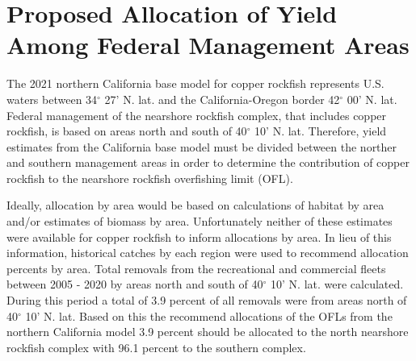 \documentclass[11pt,
  english,
  a4paper,
]{article}
\begin{document}

\hypertarget{proposed-allocation-of-yield-among-federal-management-areas}{%
\section{Proposed Allocation of Yield Among Federal Management Areas}\label{proposed-allocation-of-yield-among-federal-management-areas}}

\leavevmode\tagmcend\tagstructend


The 2021 northern California base model for copper rockfish represents U.S. waters between 34{\(^\circ\)\leavevmode\tagmcend\tagstructend} 27' N. lat. and the California-Oregon border 42{\(^\circ\)\leavevmode\tagmcend\tagstructend} 00' N. lat. Federal management of the nearshore rockfish complex, that includes copper rockfish, is based on areas north and south of 40{\(^\circ\)\leavevmode\tagmcend\tagstructend} 10' N. lat. Therefore, yield estimates from the California base model must be divided between the norther and southern management areas in order to determine the contribution of copper rockfish to the nearshore rockfish overfishing limit (OFL).

\leavevmode\tagmcend\tagstructend\par


Ideally, allocation by area would be based on calculations of habitat by area and/or estimates of biomass by area. Unfortunately neither of these estimates were available for copper rockfish to inform allocations by area. In lieu of this information, historical catches by each region were used to recommend allocation percents by area. Total removals from the recreational and commercial fleets between 2005 - 2020 by areas north and south of 40{\(^\circ\)\leavevmode\tagmcend\tagstructend} 10' N. lat. were calculated. During this period a total of 3.9 percent of all removals were from areas north of 40{\(^\circ\)\leavevmode\tagmcend\tagstructend} 10' N. lat. Based on this the recommend allocations of the OFLs from the northern California model 3.9 percent should be allocated to the north nearshore rockfish complex with 96.1 percent to the southern complex.
\end{document}

